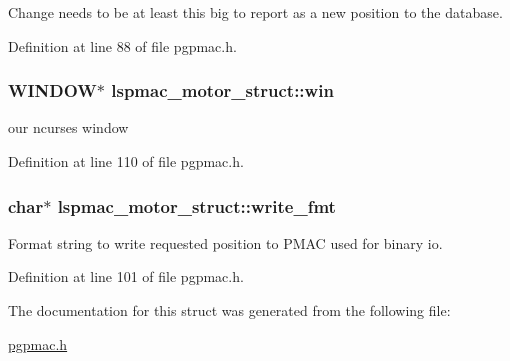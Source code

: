 Change needs to be at least this big to report as a new position to the database. 



Definition at line 88 of file pgpmac.\-h.

\hypertarget{structlspmac__motor__struct_a133775154b0e008f3a2fde6f53bc0eff}{
\subsubsection[{win}]{\setlength{\rightskip}{0pt plus 5cm}W\-I\-N\-D\-O\-W$\ast$ lspmac\-\_\-motor\-\_\-struct\-::win}}\label{structlspmac__motor__struct_a133775154b0e008f3a2fde6f53bc0eff}


our ncurses window 



Definition at line 110 of file pgpmac.\-h.

\hypertarget{structlspmac__motor__struct_a70291ddfe7994c0bec7fc2287cb6dd89}{
\subsubsection[{write\-\_\-fmt}]{\setlength{\rightskip}{0pt plus 5cm}char$\ast$ lspmac\-\_\-motor\-\_\-struct\-::write\-\_\-fmt}}\label{structlspmac__motor__struct_a70291ddfe7994c0bec7fc2287cb6dd89}


Format string to write requested position to P\-M\-A\-C used for binary io. 



Definition at line 101 of file pgpmac.\-h.



The documentation for this struct was generated from the following file\-:\begin{DoxyCompactItemize}
\item 
\hyperlink{pgpmac_8h}{pgpmac.\-h}\end{DoxyCompactItemize}
